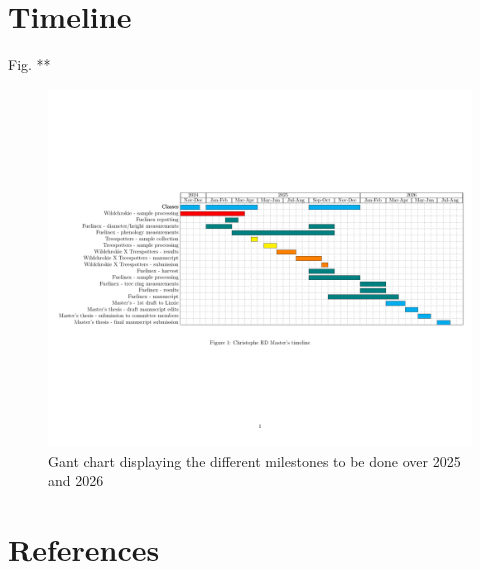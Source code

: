 \documentclass{article}
\begin{document}
\section{Timeline} 
Fig. **
\begin{figure}[h]
\includegraphics[width=1.1\textwidth]{ganttChart.pdf}
\caption{Gant chart displaying the different milestones to be done over 2025 and 2026}
\label{fig:sample}
\end{figure}

\section {References}



\end{document}
